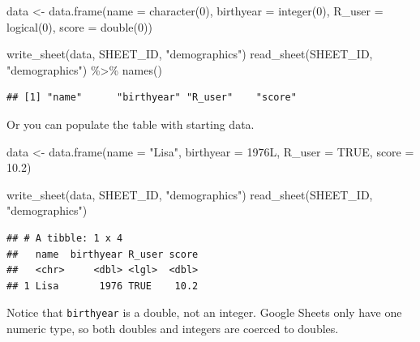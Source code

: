 \documentclass[
  oneside]{book}
\newenvironment{Shaded}{\begin{snugshade}}{\end{snugshade}}
\newcommand{\AttributeTok}[1]{\textcolor[rgb]{0.77,0.63,0.00}{#1}}
\newcommand{\ConstantTok}[1]{\textcolor[rgb]{0.00,0.00,0.00}{#1}}
\newcommand{\DecValTok}[1]{\textcolor[rgb]{0.00,0.00,0.81}{#1}}
\newcommand{\FloatTok}[1]{\textcolor[rgb]{0.00,0.00,0.81}{#1}}
\newcommand{\FunctionTok}[1]{\textcolor[rgb]{0.00,0.00,0.00}{#1}}
\newcommand{\NormalTok}[1]{#1}
\newcommand{\OtherTok}[1]{\textcolor[rgb]{0.56,0.35,0.01}{#1}}
\newcommand{\SpecialCharTok}[1]{\textcolor[rgb]{0.00,0.00,0.00}{#1}}
\newcommand{\StringTok}[1]{\textcolor[rgb]{0.31,0.60,0.02}{#1}}
\begin{document}
\begin{Shaded}
\begin{Highlighting}[]
\NormalTok{data }\OtherTok{\textless{}{-}} \FunctionTok{data.frame}\NormalTok{(}\AttributeTok{name =} \FunctionTok{character}\NormalTok{(}\DecValTok{0}\NormalTok{), }\AttributeTok{birthyear =} \FunctionTok{integer}\NormalTok{(}\DecValTok{0}\NormalTok{), }\AttributeTok{R\_user =} \FunctionTok{logical}\NormalTok{(}\DecValTok{0}\NormalTok{),}
    \AttributeTok{score =} \FunctionTok{double}\NormalTok{(}\DecValTok{0}\NormalTok{))}

\FunctionTok{write\_sheet}\NormalTok{(data, SHEET\_ID, }\StringTok{"demographics"}\NormalTok{)}
\FunctionTok{read\_sheet}\NormalTok{(SHEET\_ID, }\StringTok{"demographics"}\NormalTok{) }\SpecialCharTok{\%\textgreater{}\%}
    \FunctionTok{names}\NormalTok{()}
\end{Highlighting}
\end{Shaded}

\begin{verbatim}
## [1] "name"      "birthyear" "R_user"    "score"
\end{verbatim}

Or you can populate the table with starting data.

\begin{Shaded}
\begin{Highlighting}[]
\NormalTok{data }\OtherTok{\textless{}{-}} \FunctionTok{data.frame}\NormalTok{(}\AttributeTok{name =} \StringTok{"Lisa"}\NormalTok{, }\AttributeTok{birthyear =}\NormalTok{ 1976L, }\AttributeTok{R\_user =} \ConstantTok{TRUE}\NormalTok{, }\AttributeTok{score =} \FloatTok{10.2}\NormalTok{)}

\FunctionTok{write\_sheet}\NormalTok{(data, SHEET\_ID, }\StringTok{"demographics"}\NormalTok{)}
\FunctionTok{read\_sheet}\NormalTok{(SHEET\_ID, }\StringTok{"demographics"}\NormalTok{)}
\end{Highlighting}
\end{Shaded}

\begin{verbatim}
## # A tibble: 1 x 4
##   name  birthyear R_user score
##   <chr>     <dbl> <lgl>  <dbl>
## 1 Lisa       1976 TRUE    10.2
\end{verbatim}

\begin{info}
Notice that \texttt{birthyear} is a double, not an integer. Google Sheets only have one numeric type, so both doubles and integers are coerced to doubles.

\end{info}
\end{document}
